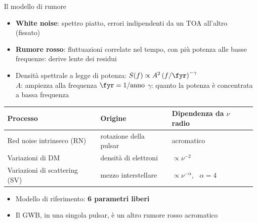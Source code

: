 \begin{frame}{Il modello di rumore}
  \begin{itemize}
    \item \textbf{White noise}: spettro piatto, errori indipendenti da un TOA all'altro (fissato)
    \item \textbf{Rumore rosso}: fluttuazioni correlate nel tempo, con più potenza
          alle basse frequenze: derive lente dei residui
    \item Densità spettrale a legge di potenza:
          $S(f) \propto A^2 \left(f/\fyr\right)^{-\gamma}$\\
          $A$: ampiezza alla frequenza $\fyr = 1/\text{anno}$ \quad
          $\gamma$: quanto la potenza è concentrata a bassa frequenza
  \end{itemize}
  \vspace{2mm}
  \centering
  \renewcommand{\arraystretch}{1.15}
  \begin{tabular}{lll}
    \toprule
    Processo & Origine & Dipendenza da $\nu$ radio \\
    \midrule
    Red noise intrinseco (RN) & rotazione della pulsar & acromatico \\
    Variazioni di DM          & densità di elettroni & $\propto \nu^{-2}$ \\
    Variazioni di scattering (SV) & mezzo interstellare & $\propto \nu^{-\alpha}$, \ $\alpha = 4$ \\
    \bottomrule
  \end{tabular}
  \vspace{2mm}
  \begin{itemize}
    \item Modello di riferimento: \textbf{6 parametri liberi}
    \item Il GWB, in una singola pulsar, è un altro rumore rosso acromatico
  \end{itemize}
\end{frame}
